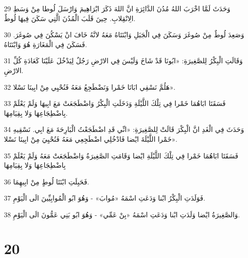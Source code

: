 \par 29 وَحَدَثَ لَمَّا اخْرَبَ اللهُ مُدُنَ الدَّائِرَةِ انَّ اللهَ ذَكَرَ ابْرَاهِيمَ وَارْسَلَ لُوطا مِنْ وَسَطِ الِانْقِلابِ. حِينَ قَلَبَ الْمُدُنَ الَّتِي سَكَنَ فِيهَا لُوطٌ.
\par 30 وَصَعِدَ لُوطٌ مِنْ صُوغَرَ وَسَكَنَ فِي الْجَبَلِ وَابْنَتَاهُ مَعَهُ لانَّهُ خَافَ انْ يَسْكُنَ فِي صُوغَرَ. فَسَكَنَ فِي الْمَغَارَةِ هُوَ وَابْنَتَاهُ.
\par 31 وَقَالَتِ الْبِكْرُ لِلصَّغِيرَةِ: «ابُونَا قَدْ شَاخَ وَلَيْسَ فِي الارْضِ رَجُلٌ لِيَدْخُلَ عَلَيْنَا كَعَادَةِ كُلِّ الارْضِ.
\par 32 هَلُمَّ نَسْقِي ابَانَا خَمْرا وَنَضْطَجِعُ مَعَهُ فَنُحْيِي مِنْ ابِينَا نَسْلا».
\par 33 فَسَقَتَا ابَاهُمَا خَمْرا فِي تِلْكَ اللَّيْلَةِ وَدَخَلَتِ الْبِكْرُ وَاضْطَجَعَتْ مَعَ ابِيهَا وَلَمْ يَعْلَمْ بِاضْطِجَاعِهَا وَلا بِقِيَامِهَا.
\par 34 وَحَدَثَ فِي الْغَدِ انَّ الْبِكْرَ قَالَتْ لِلصَّغِيرَةِ: «انِّي قَدِ اضْطَجَعْتُ الْبَارِحَةَ مَعَ ابِي. نَسْقِيهِ خَمْرا اللَّيْلَةَ ايْضا فَادْخُلِي اضْطَجِعِي مَعَهُ فَنُحْيِيَ مِنْ ابِينَا نَسْلا».
\par 35 فَسَقَتَا ابَاهُمَا خَمْرا فِي تِلْكَ اللَّيْلَةِ ايْضا وَقَامَتِ الصَّغِيرَةُ وَاضْطَجَعَتْ مَعَهُ وَلَمْ يَعْلَمْ بِاضْطِجَاعِهَا وَلا بِقِيَامِهَا
\par 36 فَحَبِلَتِ ابْنَتَا لُوطٍ مِنْ ابِيهِمَا.
\par 37 فَوَلَدَتِ الْبِكْرُ ابْنا وَدَعَتِ اسْمَهُ «مُوابَ» - وَهُوَ ابُو الْمُوابِيِّينَ الَى الْيَوْمِ.
\par 38 وَالصَّغِيرَةُ ايْضا وَلَدَتِ ابْنا وَدَعَتِ اسْمَهُ «بِنْ عَمِّي» - وَهُوَ ابُو بَنِي عَمُّونَ الَى الْيَوْمِ.

\chapter{20}

